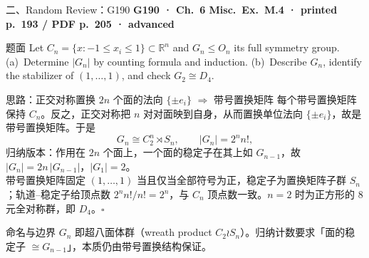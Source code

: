 \documentclass[aspectratio=169,10pt,fontset=none]{ctexbeamer}
\newcommand{\ex}[1]{\textcolor{accent}{\footnotesize\bfseries #1}}
\begin{document}
\begin{frame}[t]{二、Random Review：G190}
  \leavevmode\ex{G190 · Ch.~6 Misc.\ Ex.~M.4 · printed p.~193 / PDF p.~205 · advanced}
  \begin{block}{\footnotesize 题面}
    \scriptsize Let $C_n=\{x:-1\le x_i\le1\}\subset\mathbb R^n$ and $G_n\le O_n$ its full symmetry group. (a)~Determine $|G_n|$ by counting formula and induction. (b)~Describe $G_n$, identify the stabilizer of $(1,\ldots,1)$, and check $G_2\cong D_4$.
  \end{block}
  \begin{exampleblock}{\footnotesize 思路：正交对称置换 $2n$ 个面的法向 $\{\pm e_i\}$ $\Rightarrow$ 带号置换矩阵}
    \scriptsize
    每个带号置换矩阵保持 $C_n$。反之，正交对称把 $n$ 对对面映到自身，从而置换单位法向 $\{\pm e_i\}$，故是带号置换矩阵。于是
    $$G_n\cong C_2^n\rtimes S_n,\qquad |G_n|=2^n n!,$$
    归纳版本：作用在 $2n$ 个面上，一个面的稳定子在其上如 $G_{n-1}$，故 $|G_n|=2n\,|G_{n-1}|$，$|G_1|=2$。\\[2pt]
    带号置换矩阵固定 $(1,\ldots,1)$ 当且仅当全部符号为正，稳定子为置换矩阵子群 $S_n$；轨道--稳定子给顶点数 $2^n n!/n!=2^n$，与 $C_n$ 顶点数一致。$n=2$ 时为正方形的 $8$ 元全对称群，即 $D_4$。$\square$
  \end{exampleblock}
  \begin{block}{\footnotesize 命名与边界}
    \scriptsize $G_n$ 即超八面体群（wreath product $C_2\wr S_n$）。归纳计数要求「面的稳定子 $\cong G_{n-1}$」，本质仍由带号置换结构保证。
  \end{block}
\end{frame}
\end{document}
